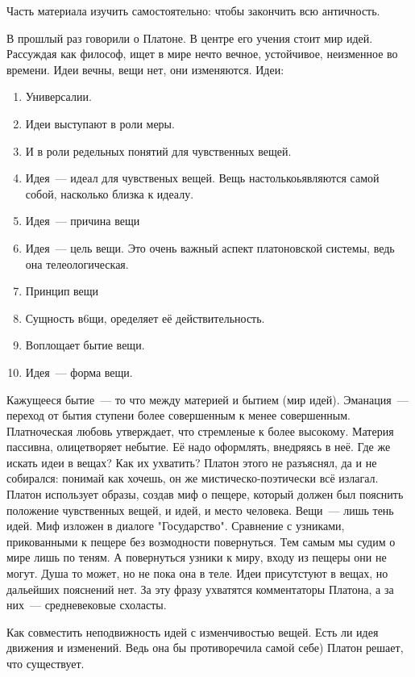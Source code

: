 
Часть материала изучить самостоятельно: чтобы закончить всю античность. 

В прошлый раз говорили о Платоне. В центре его учения стоит мир идей. Рассуждая как философ, ищет в мире нечто вечное, устойчивое, неизменное во времени. 
Идеи вечны, вещи нет, они изменяются. 
Идеи:

\begin{enumerate}
	\item Универсалии. 
	\item Идеи выступают в роли меры. 
	\item И в роли редельных понятий для чувственных вещей. 
	\item Идея~--- идеал для чувственых вещей. Вещь настолькоьявляются самой собой, насколько близка к идеалу. 
	\item Идея~--- причина вещи
	\item Идея~--- цель вещи. Это очень важный аспект платоновской системы, ведь она телеологическая. 
	\item Принцип вещи
	\item Сущность в6щи, оределяет её действительность. 
	\item Воплощает бытие вещи. 
	\item Идея~--- форма вещи. 
\end{enumerate}

Кажущееся бытие~--- то что между материей и бытием (мир идей). 
Эманация~--- переход от бытия ступени более совершенным к менее совершенным. 
Платноческая любовь утверждает, что стремленые к более высокому. 
Материя пассивна, олицетворяет небытие. Её надо оформлять, внедряясь в неё. 
Где же искать идеи в вещах? Как их ухватить?
Платон этого не разъяснял, да и не собирался: понимай как хочешь, он же мистическо-поэтически всё излагал. Платон использует образы, создав миф о пещере, который должен был пояснить положение чувственных вещей, и идей, и место человека. 
Вещи~--- лишь тень идей. Миф изложен в диалоге "Государство". Сравнение с узниками, прикованными к пещере без возмодности повернуться. Тем самым мы судим о мире лишь по теням. 
А повернуться узники к миру, входу из пещеры они не могут. Душа то может, но не пока она в теле. 
Идеи присутстуют в вещах, но дальейших пояснений нет. За эту фразу ухватятся комментаторы Платона, а за них~--- средневековые схоласты. 

Как совместить неподвижность идей с изменчивостью вещей. Есть ли идея движения и изменений. Ведь она бы противоречила самой себе) Платон решает, что существует. 

